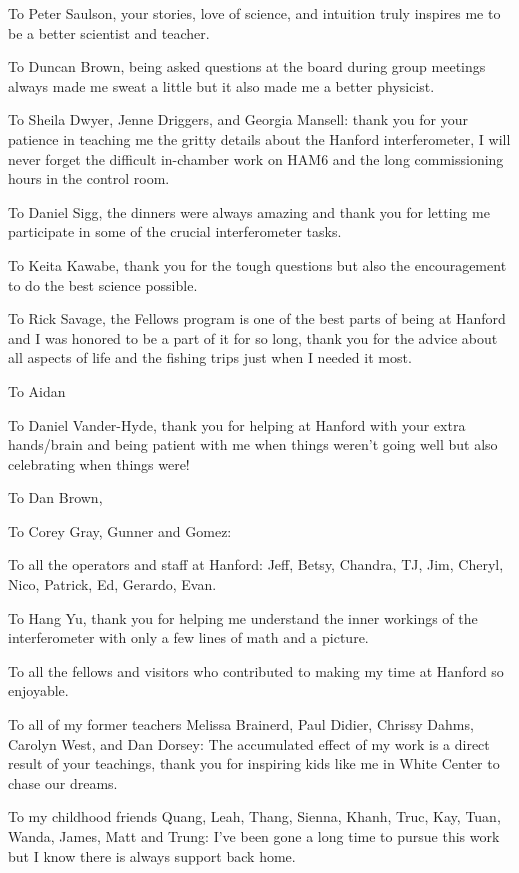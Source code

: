 \documentclass[oneside,12pt]{book}
\begin{document}
To Peter Saulson, your stories, love of science, and intuition truly inspires me to be a better scientist and teacher.

To Duncan Brown, being asked questions at the board during group meetings always made me sweat a little but it also made me a better physicist.

To Sheila Dwyer, Jenne Driggers, and Georgia Mansell: thank you for your patience in teaching me the gritty details about the Hanford interferometer, I will never forget the difficult in-chamber work on HAM6 and the long commissioning hours in the control room.

To Daniel Sigg, the dinners were always amazing and thank you for letting me participate in some of the crucial interferometer tasks.

To Keita Kawabe, thank you for the tough questions but also the encouragement to do the best science possible.

To Rick Savage, the Fellows program is one of the best parts of being at Hanford and I was honored to be a part of it for so long, thank you for the advice about all aspects of life and the fishing trips just when I needed it most.

To Aidan

To Daniel Vander-Hyde, thank you for helping at Hanford with your extra hands/brain and being patient with me when things weren't going well but also celebrating when things were!

To Dan Brown,

To Corey Gray, Gunner and Gomez:

To all the operators and staff at Hanford: Jeff, Betsy, Chandra, TJ, Jim, Cheryl, Nico, Patrick, Ed, Gerardo, Evan.

To Hang Yu, thank you for helping me understand the inner workings of the interferometer with only a few lines of math and a picture.

To all the fellows and visitors who contributed to making my time at Hanford so enjoyable.

To all of my former teachers Melissa Brainerd, Paul Didier, Chrissy Dahms, Carolyn West, and Dan Dorsey:  The accumulated effect of my work is a direct result of your teachings, thank you for inspiring kids like me in White Center to chase our dreams.

To my childhood friends Quang, Leah, Thang, Sienna, Khanh, Truc, Kay, Tuan, Wanda, James, Matt and Trung:  I've been gone a long time to pursue this work but I know there is always support back home.
\end{document}
